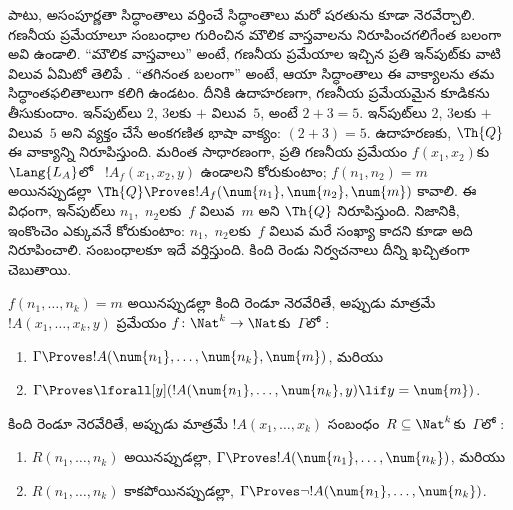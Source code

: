\documentclass[../../../include/open-logic-section]{subfiles}
\begin{document}
 పాటు, అసంపూర్ణతా సిద్ధాంతాలు
వర్తించే సిద్ధాంతాలు మరో షరతును కూడా నెరవేర్చాలి. గణనీయ ప్రమేయాలూ
 సంబంధాల గురించిన మౌలిక వాస్తవాలను
నిరూపించగలిగేంత బలంగా అవి ఉండాలి. ``మౌలిక వాస్తవాలు'' అంటే, గణనీయ ప్రమేయాల
ఇచ్చిన ప్రతి ఇన్‌పుట్‌కు వాటి విలువ ఏమిటో తెలిపే .
``తగినంత బలంగా'' అంటే, ఆయా సిద్ధాంతాలు ఈ వాక్యాలను తమ సిద్ధాంతఫలితాలుగా
కలిగి ఉండటం. దీనికి ఉదాహరణగా, గణనీయ ప్రమేయమైన కూడికను తీసుకుందాం. ఇన్‌పుట్‌లు
$2$, $3$లకు $+$ విలువ~$5$, అంటే $2+3=5$. ఇన్‌పుట్‌లు $2$, $3$లకు $+$ విలువ~$5$
అని వ్యక్తం చేసే అంకగణిత భాషా వాక్యం: $(\num{2}+\num{3})=\num{5}$. ఉదాహరణకు,
$\Th{Q}$ ఈ వాక్యాన్ని నిరూపిస్తుంది. మరింత సాధారణంగా, ప్రతి గణనీయ ప్రమేయం
$f(x_1,x_2)$కు $\Lang{L_A}$లో ~$!A_f(x_1,x_2,y)$
ఉండాలని కోరుకుంటాం; $f(n_1,n_2)=m$ అయినప్పుడల్లా $\Th{Q}\Proves
!A_f(\num{n_1},\num{n_2},\num{m})$ కావాలి. ఈ విధంగా, ఇన్‌పుట్‌లు
$n_1$,~$n_2$లకు~$f$ విలువ~$m$ అని $\Th{Q}$ నిరూపిస్తుంది. నిజానికి, ఇంకొంచెం
ఎక్కువనే కోరుకుంటాం: $n_1$,~$n_2$లకు~$f$ విలువ మరే సంఖ్యా కాదని కూడా అది
నిరూపించాలి.  సంబంధాలకూ ఇదే వర్తిస్తుంది.
కింది రెండు నిర్వచనాలు దీన్ని ఖచ్చితంగా చెబుతాయి.

\begin{defn}
$f(n_1,\dots,n_k)=m$ అయినప్పుడల్లా కింది రెండూ నెరవేరితే, అప్పుడు మాత్రమే
~$!A(x_1,\dots,x_k,y)$ ప్రమేయం
$f\colon\Nat^k\to\Nat$కు~$\Gamma$లో
\emph{}:
\begin{enumerate}
\item $\Gamma \Proves !A(\num{n_1}, \dots, \num{n_k}, \num{m})$, మరియు
\item $\Gamma \Proves \lforall[y](!A(\num{n_1}, \dots, \num{n_k},
y) \lif y = \num{m})$.
\end{enumerate}
\end{defn}

\begin{defn}
కింది రెండూ నెరవేరితే, అప్పుడు మాత్రమే 
$!A(x_1,\dots,x_k)$ సంబంధం~$R\subseteq\Nat^k$కు~$\Gamma$లో
\emph{}:
\begin{enumerate}
\item $R(n_1, \dots, n_k)$ అయినప్పుడల్లా, $\Gamma \Proves !A(\num{n_1},
\dots, \num{n_k})$, మరియు
\item $R(n_1, \dots, n_k)$ కాకపోయినప్పుడల్లా, $\Gamma \Proves \lnot
!A(\num{n_1}, \dots, \num{n_k})$.
\end{enumerate}
\end{defn}
\end{document}
